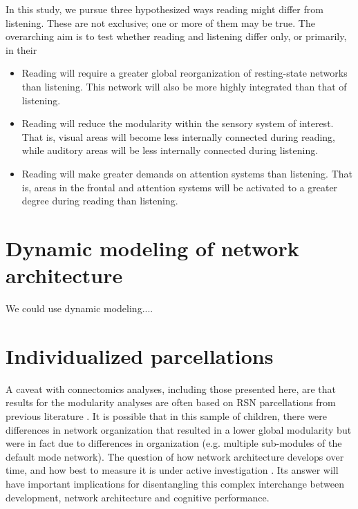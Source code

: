 In this study, we pursue three hypothesized ways reading might differ from listening. These are not exclusive; one or more of them may be true. The overarching aim is to test whether reading and listening differ only, or primarily, in their 

\begin{itemize}
	\item Reading will require a greater global reorganization of resting-state networks than listening. This network will also be more highly integrated than that of listening. 
	\item Reading will reduce the modularity within the sensory system of interest. That is, visual areas will become less internally connected during reading, while auditory areas will be less internally connected during listening.
	\item Reading will make greater demands on attention systems than listening. That is, areas in the frontal and attention systems will be activated to a greater degree during reading than listening.
\end{itemize}




\section{Dynamic modeling of network architecture}

We could use dynamic modeling....

\section{Individualized parcellations}

A caveat with connectomics analyses, including those presented here, are that results for the modularity analyses are often based on RSN parcellations from previous literature \citep{Power2011}. It is possible that in this sample of children, there were differences in network organization that resulted in a lower global modularity but were in fact due to differences in organization (e.g. multiple sub-modules of the default mode network). The question of how network architecture develops over time, and how best to measure it is under active investigation \citep{Cao2016}. Its answer will have important implications for disentangling this complex interchange between development, network architecture and cognitive performance.



